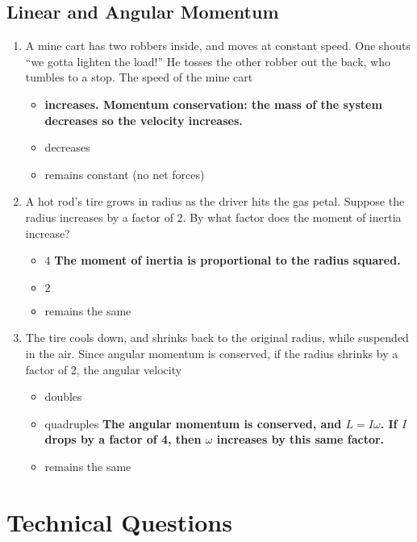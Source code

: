 \documentclass[10pt]{article}
\begin{document}
\subsection{Linear and Angular Momentum}
\begin{enumerate}
\item A mine cart has two robbers inside, and moves at constant speed.  One shouts ``we gotta lighten the load!''  He tosses the other robber out the back, who tumbles to a stop.  The speed of the mine cart 
\begin{itemize}
\item \textbf{increases.  Momentum conservation: the mass of the system decreases so the velocity increases.}
\item decreases
\item remains constant (no net forces)
\end{itemize}
\item A hot rod's tire grows in radius as the driver hits the gas petal. Suppose the radius increases by a factor of $2$.  By what factor does the moment of inertia increase?
\begin{itemize}
\item $4$ \textbf{The moment of inertia is proportional to the radius squared.}
\item $2$
\item remains the same
\end{itemize}
\item The tire cools down, and shrinks back to the original radius, while suspended in the air.  Since angular momentum is conserved, if the radius shrinks by a factor of 2, the angular velocity
\begin{itemize}
\item doubles
\item quadruples \textbf{The angular momentum is conserved, and $L = I\omega$.  If $I$ drops by a factor of 4, then $\omega$ increases by this same factor.}
\item remains the same
\end{itemize}
\end{enumerate}
\section{Technical Questions}
\end{document}
